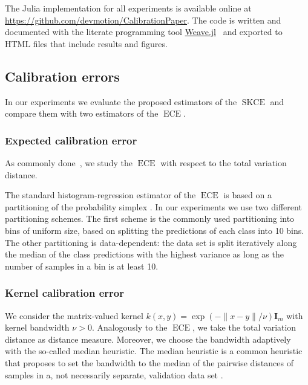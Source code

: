 \documentclass{article}
\DeclareMathOperator{\ECE}{ECE}
\DeclareMathOperator{\squaredkernelmeasure}{SKCE}
\begin{document}
The Julia implementation for all experiments is available online at
\url{https://github.com/devmotion/CalibrationPaper}. The code is written and
documented with the literate programming tool
\href{https://github.com/JunoLab/Weave.jl}{Weave.jl}~\cite{pastell17_weave}
and exported to HTML files that include results and figures.

\subsection{Calibration errors}

In our experiments we evaluate the proposed estimators of the
$\squaredkernelmeasure$ and compare them with two estimators of the $\ECE$.

\subsubsection{Expected calibration error}

As commonly done~\citep{broecker07_increas_reliab_reliab_diagr,guo17_calib_moder_neural_networ,vaicenavicius19_evaluat},
we study the $\ECE$ with respect to the total variation distance.

The standard histogram-regression estimator of the $\ECE$ is based on a
partitioning of the probability simplex
\citep{guo17_calib_moder_neural_networ,vaicenavicius19_evaluat}. In our experiments
we use two different partitioning schemes. The first scheme is the commonly
used partitioning into bins of uniform size, based on splitting the predictions
of each class into 10 bins. The other partitioning is data-dependent: the data
set is split iteratively along the median of the class predictions with the
highest variance as long as the number of samples in a bin is at least 10.

\subsubsection{Kernel calibration error}

We consider the matrix-valued kernel
$k(x, y) = \exp{(-\|x - y\| / \nu)} \mathbf{I}_m$ with kernel bandwidth
$\nu > 0$. Analogously to the $\ECE$, we take the total variation distance as
distance measure. Moreover, we choose the bandwidth adaptively with the
so-called median heuristic. The median heuristic is a common heuristic that
proposes to set the bandwidth to the median of the pairwise distances of samples
in a, not necessarily separate, validation data set
\citep[see, e.g.,][]{gretton12_kernel_two_sampl_test}.
\end{document}
